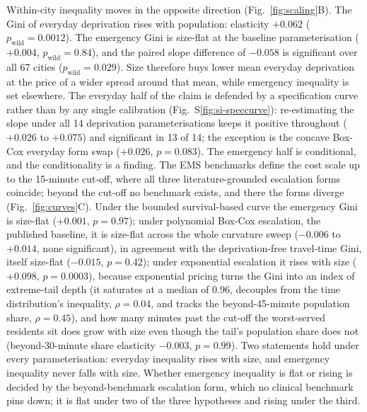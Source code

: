 \documentclass[11pt]{article}
\newcommand{\pw}[1]{$p_{\mathrm{wild}} = #1$}
\begin{document}
Within-city inequality moves in the opposite direction
(Fig.~\ref{fig:scaling}B). The Gini of everyday deprivation rises with
population: elasticity $+0.062$ (\pw{0.0012}). The emergency Gini is
size-flat at the baseline parameterisation ($+0.004$, \pw{0.84}), and the
paired slope difference of $-0.058$ is significant over all 67 cities
(\pw{0.029}). Size therefore buys lower mean everyday deprivation at the
price of a wider spread around that mean, while emergency inequality is
set elsewhere. The everyday half of the claim is defended by a
specification curve \citep{simonsohn2020specification} rather than by any
single calibration (Fig.~S\ref{fig:si-speccurve}): re-estimating the slope
under all 14 deprivation parameterisations keeps it positive throughout
($+0.026$ to $+0.075$) and significant in 13 of 14; the exception is the
concave Box-Cox everyday form swap ($+0.026$, $p = 0.083$). The emergency
half is conditional, and the conditionality is a finding. The EMS
benchmarks define the cost scale up to the 15-minute cut-off, where all
three literature-grounded escalation forms coincide; beyond the cut-off no
benchmark exists, and there the forms diverge (Fig.~\ref{fig:curves}C).
Under the bounded survival-based curve the emergency Gini is size-flat
($+0.001$, $p = 0.97$); under polynomial Box-Cox escalation, the published
baseline, it is size-flat across the whole curvature sweep ($-0.006$ to
$+0.014$, none significant), in agreement with the deprivation-free
travel-time Gini, itself size-flat ($-0.015$, $p = 0.42$); under
exponential escalation it rises with size ($+0.098$, $p = 0.0003$),
because exponential pricing turns the Gini into an index of extreme-tail
depth (it saturates at a median of 0.96, decouples from the time
distribution's inequality, $\rho = 0.04$, and tracks the beyond-45-minute
population share, $\rho = 0.45$), and how many minutes past the cut-off the
worst-served residents sit does grow with size even though the tail's
population share does not (beyond-30-minute share elasticity $-0.003$,
$p = 0.99$). Two statements hold under every parameterisation: everyday
inequality rises with size, and emergency inequality never falls with
size. Whether emergency inequality is flat or rising is decided by the
beyond-benchmark escalation form, which no clinical benchmark pins down;
it is flat under two of the three hypotheses and rising under the third.
\end{document}
